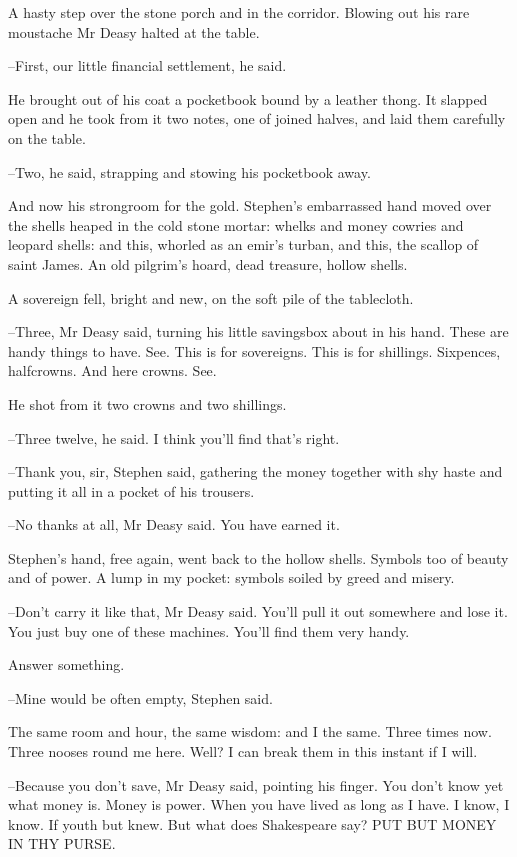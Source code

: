 A hasty step over the stone porch and in the corridor. Blowing out his
rare moustache Mr Deasy halted at the table.

--First, our little financial settlement, he said.

He brought out of his coat a pocketbook bound by a leather thong. It
slapped open and he took from it two notes, one of joined halves, and laid
them carefully on the table.

--Two, he said, strapping and stowing his pocketbook away.

And now his strongroom for the gold. Stephen's embarrassed hand
moved over the shells heaped in the cold stone mortar: whelks and money
cowries and leopard shells: and this, whorled as an emir's turban, and
this, the scallop of saint James. An old pilgrim's hoard, dead treasure,
hollow shells.

A sovereign fell, bright and new, on the soft pile of the tablecloth.

--Three, Mr Deasy said, turning his little savingsbox about in his hand.
These are handy things to have. See. This is for sovereigns. This is for
shillings. Sixpences, halfcrowns. And here crowns. See.

He shot from it two crowns and two shillings.

--Three twelve, he said. I think you'll find that's right.

--Thank you, sir, Stephen said, gathering the money together with shy
haste and putting it all in a pocket of his trousers.

--No thanks at all, Mr Deasy said. You have earned it.

Stephen's hand, free again, went back to the hollow shells. Symbols
too of beauty and of power. A lump in my pocket: symbols soiled by greed
and misery.

--Don't carry it like that, Mr Deasy said. You'll pull it out somewhere
and lose it. You just buy one of these machines. You'll find them very
handy.

Answer something.

--Mine would be often empty, Stephen said.

The same room and hour, the same wisdom: and I the same. Three
times now. Three nooses round me here. Well? I can break them in this
instant if I will.

--Because you don't save, Mr Deasy said, pointing his finger. You don't
know yet what money is. Money is power. When you have lived as long as I
have. I know, I know. If youth but knew. But what does Shakespeare say?
PUT BUT MONEY IN THY PURSE.

